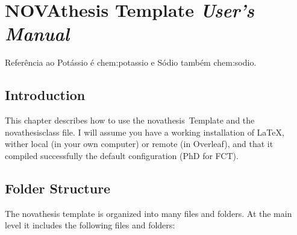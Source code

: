 \chapter{NOVAthesis Template \emph{User's Manual}}
\label{cha:users_manual}

\glsresetall

\begin{center}
\end{center}

Referência ao Potássio é \gls{chem:potassio} e Sódio também \gls{chem:sodio}.

\section{Introduction}
\label{sec:introduction}

This chapter describes how to use the \gls{novathesis}\ Template and the \gls{novathesisclass} file.  I will assume you have a working installation of \LaTeX, wither local (in your own computer) or remote (in Overleaf), and that it compiled successfully the default configuration (PhD for \gls{FCT}).


\section{Folder Structure}
\label{sec:folder_structure}

The \gls{novathesis} template is organized into many files and folders. At the main level it includes the following files and folders:

